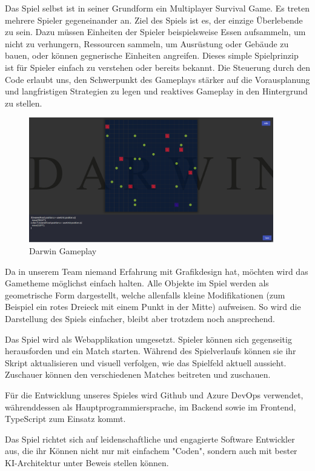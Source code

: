 \documentclass[a4paper, 11pt]{scrartcl}
\begin{document}
Das Spiel selbst ist in seiner Grundform ein Multiplayer Survival Game.
Es treten mehrere Spieler gegeneinander an.
Ziel des Spiels ist es, der einzige Überlebende zu sein.
Dazu müssen Einheiten der Spieler beispielsweise Essen aufsammeln,
um nicht zu verhungern, Ressourcen sammeln, um Ausrüstung oder Gebäude zu bauen,
oder können gegnerische Einheiten angreifen.
Dieses simple Spielprinzip ist für Spieler einfach zu verstehen oder bereits bekannt.
Die Steuerung durch den Code erlaubt uns,
den Schwerpunkt des Gameplays stärker auf die Vorausplanung und langfristigen Strategien
zu legen und reaktives Gameplay in den Hintergrund zu stellen.

\begin{figure}[h]
  \caption{Darwin Gameplay}
  \centering
  \includegraphics[width=0.95\textwidth]{./img/darwin-gameplay}
\end{figure}

Da in unserem Team niemand Erfahrung mit Grafikdesign hat, möchten wird das Gametheme möglichst einfach halten. Alle Objekte im Spiel 
werden als geometrische Form dargestellt, welche allenfalls kleine Modifikationen (zum Beispiel ein rotes Dreieck mit einem
Punkt in der Mitte) aufweisen. So wird die Darstellung des Spiels einfacher, bleibt aber trotzdem noch ansprechend. 

Das Spiel wird als Webapplikation umgesetzt.
Spieler können sich gegenseitig herausforden und ein Match starten.
Während des Spielverlaufs können sie ihr Skript aktualisieren und visuell verfolgen,
wie das Spielfeld aktuell aussieht. Zuschauer können den verschiedenen Matches beitreten und zuschauen.

Für die Entwicklung unseres Spieles wird Github und Azure DevOps verwendet,
währenddessen als Hauptprogrammiersprache, im Backend sowie im Frontend, TypeScript zum Einsatz kommt.

Das Spiel richtet sich auf leidenschaftliche und engagierte Software Entwickler aus, die ihr Können nicht nur mit einfachem "Coden", sondern auch mit bester KI-Architektur unter Beweis stellen können.
\end{document}
